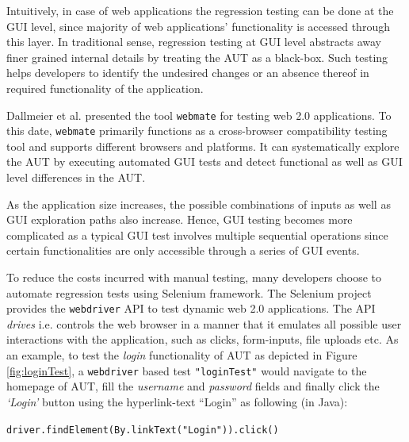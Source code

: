 Intuitively, in case of web applications the regression testing can be done at the GUI level, since majority of web applications’ functionality is accessed through this layer. In traditional sense, regression testing at GUI level abstracts away finer grained internal details by treating the AUT as a black-box. Such testing helps developers to identify the undesired  changes or an absence thereof in required functionality of the application.

Dallmeier et al. \cite{webmate} presented the tool \texttt{webmate} for testing web 2.0 applications. To this date, \texttt{webmate} primarily functions as a cross-browser compatibility testing tool and supports different browsers and platforms. It can systematically explore the AUT by executing automated GUI tests and detect functional as well as GUI level differences in the AUT. 

As the application size increases, the possible combinations of inputs as well as GUI exploration paths also increase. Hence, GUI testing becomes more complicated as a typical GUI test involves multiple sequential operations since certain functionalities are only accessible through a series of GUI events.

To reduce the costs incurred with manual testing, many developers choose to automate regression tests using Selenium\cite{websiteSelenium} framework. The Selenium project provides the \texttt{webdriver} API to test dynamic web 2.0 applications. The API \textit{drives} i.e. controls the web browser in a manner that it emulates all possible user interactions with the application, such as clicks, form-inputs, file uploads etc. 
As an example, to test the \textit{login} functionality of AUT as depicted in Figure \ref{fig:loginTest}, a \texttt{webdriver} based test \texttt{"loginTest"} would navigate to the homepage of AUT, fill the \textit{username} and \textit{password} fields and finally click the \textit{`Login'} button using the hyperlink-text ``Login'' as following (in Java):
\begin{small}
\texttt{driver.findElement(By.linkText("Login")).click()}
\end{small}



